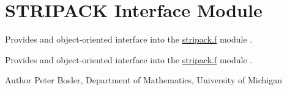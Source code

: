 \hypertarget{group__STRIPACKInterface}{\section{S\+T\+R\+I\+P\+A\+C\+K Interface Module}
\label{group__STRIPACKInterface}
}


Provides and object-\/oriented interface into the \hyperlink{stripack_8f}{stripack.\+f} module \cite{STRIPACK} .  


Provides and object-\/oriented interface into the \hyperlink{stripack_8f}{stripack.\+f} module \cite{STRIPACK} . 

\begin{DoxyAuthor}{Author}
Peter Bosler, Department of Mathematics, University of Michigan 
\end{DoxyAuthor}
